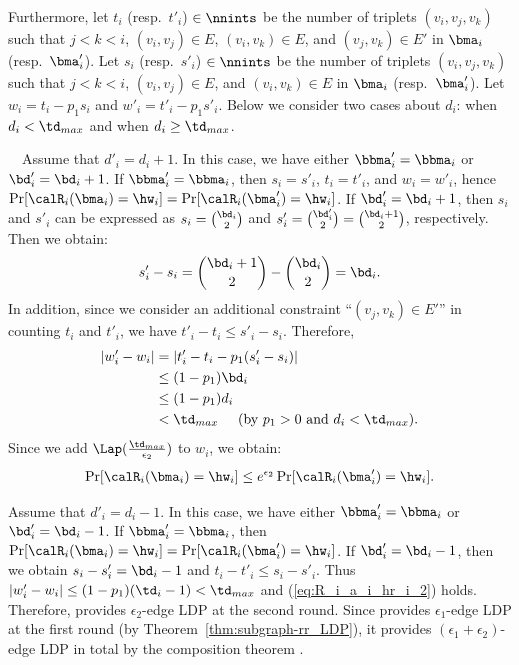 Furthermore, 
let $t_i$ (resp.~$t'_i$) $\in \nnints$ be the number of triplets $(v_i, v_j, v_k)$ such that $j < k < i$, $(v_i,v_j) \in E$, $(v_i,v_k) \in E$, and $(v_j,v_k) \in E'$ in $\bma_i$ (resp.~$\bma'_i$). 
Let $s_i$ (resp.~$s'_i$) $\in \nnints$ be the number of triplets $(v_i, v_j, v_k)$ such that $j < k < i$, $(v_i,v_j) \in E$, and $(v_i,v_k) \in E$ in $\bma_i$ (resp.~$\bma'_i$). 
Let $w_i = t_i - p_1 s_i$ and $w'_i = t'_i - p_1 s'_i$. 
Below we consider two cases about $d_i$: when $d_i < \td_{max}$ and when $d_i \geq \td_{max}$. 

\smallskip
{}~~Assume that $d'_i = d_i + 1$. 
In this case, we have either $\bbma'_i = \bbma_i$ or $\bd'_i = \bd_i+1$. 
If $\bbma'_i = \bbma_i$, then $s_i = s'_i$, $t_i = t'_i$, and $w_i = w'_i$, hence $\Pr[\calR_i(\bma_i) = \hw_i] = \Pr[\calR_i(\bma'_i) = \hw_i]$. 
If $\bd'_i = \bd_i+1$, then $s_i$ and $s'_i$ can be expressed as $s_i = \binom{\bd_i}{2}$ and $s'_i = \binom{\bd'_i}{2} = \binom{\bd_i+1}{2}$, respectively. 
Then we obtain:
\begin{align*}
s'_i - s_i = \binom{\bd_i+1}{2} - \binom{\bd_i}{2} = \bd_i.
\end{align*}
In addition, since we consider an additional constraint ``$(v_j,v_k) \in E'$'' in counting $t_i$ and $t'_i$, 
we have $t'_i - t_i \leq s'_i - s_i$. 
Therefore, 
\begin{align*}
|w'_i - w_i| 
&= |t'_i - t_i - p_1 (s'_i - s_i)| \\
&\leq (1 - p_1) \bd_i \\
&\leq (1 - p_1) d_i \\
&< \td_{max} \hspace{5mm} \text{(by $p_1 > 0$ and $d_i < \td_{max}$)}.
\end{align*}
Since we add $\Lap(\frac{\td_{max}}{\epsilon_2})$ to $w_i$, we obtain:
\begin{align}
\Pr[\calR_i(\bma_i) = \hw_i] \leq e^{\epsilon_2} \Pr[\calR_i(\bma'_i) = \hw_i]. 
\label{eq:R_i_a_i_hr_i_2}
\end{align}

Assume that $d'_i = d_i - 1$. 
In this case, we have either $\bbma'_i = \bbma_i$ or $\bd'_i = \bd_i-1$. 
If $\bbma'_i = \bbma_i$, then $\Pr[\calR_i(\bma_i) = \hw_i] = \Pr[\calR_i(\bma'_i) = \hw_i]$. 
If $\bd'_i = \bd_i-1$, then we obtain $s_i - s'_i = \bd_i - 1$ and $t_i - t'_i \leq s_i - s'_i$. 
Thus $|w'_i - w_i| \leq (1-p_1) (\td_i - 1) < \td_{max}$ and (\ref{eq:R_i_a_i_hr_i_2}) holds. 
Therefore,  provides $\epsilon_2$-edge LDP at the second round. 
Since  provides $\epsilon_1$-edge LDP at the first round (by Theorem~\ref{thm:subgraph-rr_LDP}), it provides $(\epsilon_1 + \epsilon_2)$-edge LDP in total by the composition theorem \cite{DP}. 

